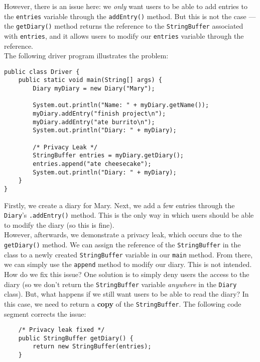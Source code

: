 However, there is an issue here: we \textit{only} want users to be able to add entries to the \verb!entries! variable through the \verb!addEntry()! method. But this is not the case --- the \verb!getDiary()! method returns the reference to the \verb!StringBuffer! associated with \verb!entries!, and it allows users to modify our \verb!entries! variable through the reference. \\

The following driver program illustrates the problem: \\


\begin{lstlisting}
public class Driver {
	public static void main(String[] args) {
		Diary myDiary = new Diary("Mary");

		System.out.println("Name: " + myDiary.getName());
		myDiary.addEntry("finish project\n");
		myDiary.addEntry("ate burrito\n");
		System.out.println("Diary: " + myDiary);

		/* Privacy Leak */
		StringBuffer entries = myDiary.getDiary();
		entries.append("ate cheesecake");
		System.out.println("Diary: " + myDiary);
	}
}
\end{lstlisting}

Firstly, we create a diary for Mary. Next, we add a few entries through the \verb!Diary!'s \verb!.addEntry()! method. This is the only way in which users should be able to modify the diary (so this is fine). \\

However, afterwards, we demonstrate a privacy leak, which occurs due to the \verb!getDiary()! method. We can assign the reference of the \verb!StringBuffer! in the class to a newly created \verb!StringBuffer! variable in our \verb!main! method. From there, we can simply use the \verb!append! method to modify our diary. This is not intended. \\


How do we fix this issue? One solution is to simply deny users the access to the diary (so we don't return the \verb!StringBuffer! variable \textit{anywhere} in the \verb!Diary! class). But, what happens if we still want users to be able to read the diary? In this case, we need to return a \textbf{copy} of the \verb!StringBuffer!. The following code segment corrects the issue:

\begin{lstlisting}
	/* Privacy leak fixed */
	public StringBuffer getDiary() {
		return new StringBuffer(entries);
	}
\end{lstlisting}

